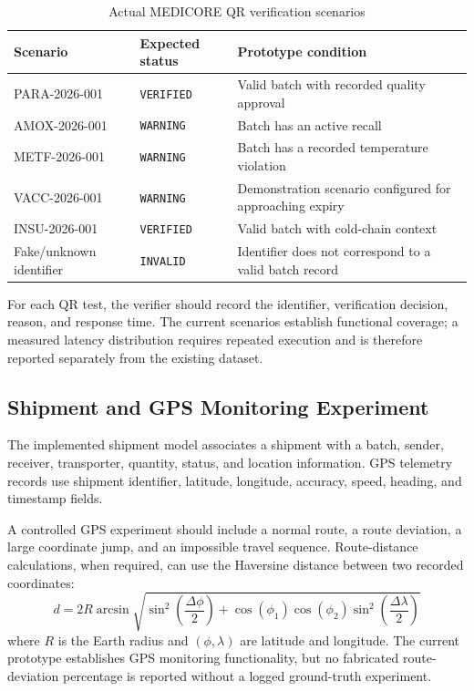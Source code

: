 \documentclass[11pt,a4paper]{article}
\begin{document}
\begin{table}[htbp]
\centering
\caption{Actual MEDICORE QR verification scenarios}
\label{tab:qr_scenarios}
\vspace{0.5em}
\begin{tabularx}{\textwidth}{llX}
\toprule
\textbf{Scenario} & \textbf{Expected status} & \textbf{Prototype condition} \\
\midrule
PARA-2026-001 & \texttt{VERIFIED} & Valid batch with recorded quality approval \\
AMOX-2026-001 & \texttt{WARNING} & Batch has an active recall \\
METF-2026-001 & \texttt{WARNING} & Batch has a recorded temperature violation \\
VACC-2026-001 & \texttt{WARNING} & Demonstration scenario configured for approaching expiry \\
INSU-2026-001 & \texttt{VERIFIED} & Valid batch with cold-chain context \\
Fake/unknown identifier & \texttt{INVALID} & Identifier does not correspond to a valid batch record \\
\bottomrule
\end{tabularx}
\end{table}

For each QR test, the verifier should record the identifier, verification decision, reason, and response time. The current scenarios establish functional coverage; a measured latency distribution requires repeated execution and is therefore reported separately from the existing dataset.

\subsection{Shipment and GPS Monitoring Experiment}
The implemented shipment model associates a shipment with a batch, sender, receiver, transporter, quantity, status, and location information. GPS telemetry records use shipment identifier, latitude, longitude, accuracy, speed, heading, and timestamp fields.

A controlled GPS experiment should include a normal route, a route deviation, a large coordinate jump, and an impossible travel sequence. Route-distance calculations, when required, can use the Haversine distance between two recorded coordinates:
\begin{equation}
d = 2R \arcsin \sqrt{\sin^2\left(\frac{\Delta \phi}{2}\right) + \cos(\phi_1)\cos(\phi_2)\sin^2\left(\frac{\Delta \lambda}{2}\right)}
\end{equation}
where $R$ is the Earth radius and $(\phi, \lambda)$ are latitude and longitude. The current prototype establishes GPS monitoring functionality, but no fabricated route-deviation percentage is reported without a logged ground-truth experiment.
\end{document}
